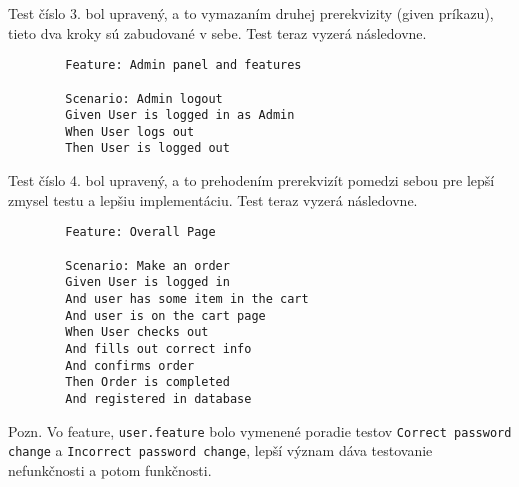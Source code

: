 \documentclass[titlepage]{article}
\begin{document}
        Test číslo 3. bol upravený, a to vymazaním druhej prerekvizity
        (given príkazu), tieto dva kroky sú zabudované v sebe.
        Test teraz vyzerá následovne.

        \begin{verbatim}
        Feature: Admin panel and features
        
        Scenario: Admin logout
        Given User is logged in as Admin
        When User logs out
        Then User is logged out
        \end{verbatim}

        Test číslo 4. bol upravený, a to prehodením prerekvizít pomedzi
        sebou pre lepší zmysel testu a lepšiu implementáciu.
        Test teraz vyzerá následovne.

        \begin{verbatim}
        Feature: Overall Page

        Scenario: Make an order
        Given User is logged in 
        And user has some item in the cart
        And user is on the cart page
        When User checks out 
        And fills out correct info
        And confirms order
        Then Order is completed 
        And registered in database
        \end{verbatim}

        Pozn. Vo feature, \verb|user.feature| bolo vymenené poradie testov
        \verb|Correct password change| a \verb|Incorrect password change|, lepší
        význam dáva testovanie nefunkčnosti a potom funkčnosti.
\end{document}
